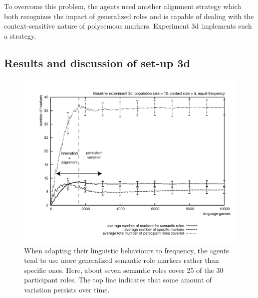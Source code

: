 To overcome this problem, the agents need another alignment strategy which both recognizes the impact of generalized roles and is capable of dealing with the context-sensitive nature of polysemous markers. Experiment 3d implements such a strategy.

\subsection{Results and discussion of set-up 3d}

\begin{figure}[ht]
\centerline{\includegraphics[width=\textwidth]{Chapter3/figs/graph-base3-success3d}}
  \caption[Baseline experiment 3d: number of markers]{When adapting their linguistic behaviours to frequency, the agents tend to use more generalized semantic role markers rather than specific ones. Here, about seven semantic roles cover 25 of the 30 participant roles. The top line indicates that some amount of variation persists over time.}
   \label{f:base3-size3d}
\end{figure}


